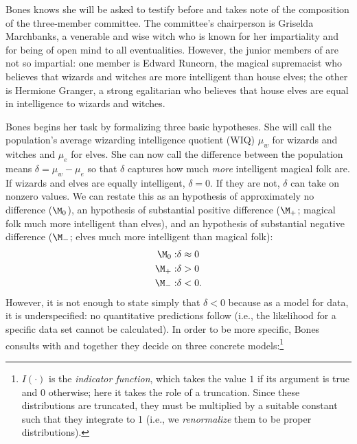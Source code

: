 Bones knows she will be asked to testify before \wishes{} and takes note of the composition of the three-member committee. The committee's chairperson is Griselda Marchbanks, a venerable and wise witch who is known for her impartiality and for being of open mind to all eventualities. However, the junior members of \wishes{} are not so impartial: one member is Edward Runcorn, the magical supremacist who believes that wizards and witches are more intelligent than house elves; the other is Hermione Granger, a strong egalitarian who believes that house elves are equal in intelligence to wizards and witches.

Bones begins her task by formalizing three basic hypotheses.  She will call the population's average wizarding intelligence quotient (WIQ) $\mu_w$ for wizards and witches and $\mu_e$ for elves.  She can now call the difference between the population means $\delta = \mu_w - \mu_e$ so that $\delta$ captures how much \emph{more} intelligent magical folk are.  If wizards and elves are equally intelligent, $\delta=0$. If they are not, $\delta$ can take on nonzero values.
We can restate this as an hypothesis of approximately no difference ($\M_0$), an hypothesis of substantial positive difference ($\M_+$; magical folk much more intelligent than elves), and an hypothesis of substantial negative difference ($\M_-$; elves much more intelligent than magical folk):
\begin{eqnarray*}
\M_0:& \delta \approx 0\\
\M_+:& \delta >       0\\
\M_-:& \delta <       0.
\end{eqnarray*}
However, it is not enough to state simply that $\delta < 0$ because as a model for data, it is underspecified: no quantitative predictions follow (i.e., the likelihood for a specific data set cannot be calculated). In order to be more specific, Bones consults with \wishes{} and together they decide on three concrete models:\footnote{$I(\cdot)$ is the \emph{indicator function}, which takes the value $1$ if its argument is true and $0$ otherwise; here it takes the role of a truncation. Since these distributions are truncated, they must be multiplied by a suitable constant such that they integrate to 1 (i.e., we \textit{renormalize} them to be proper distributions).}

